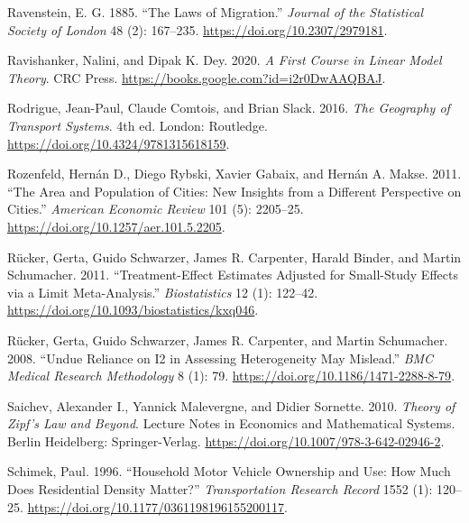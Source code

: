 \documentclass[
  11pt,
  openany]{memoir}
\newlength{\cslhangindent}
\newlength{\cslentryspacingunit} %
\newenvironment{CSLReferences}[2] %
 {%
  \setlength{\parindent}{0pt}
  \ifodd #1
  \let\oldpar\par
  \def\par{\hangindent=\cslhangindent\oldpar}
  \fi
  \setlength{\parskip}{#2\cslentryspacingunit}
 }%
 {}
\begin{document}
\begin{CSLReferences}{1}{0}
\leavevmode{}%
Ravenstein, E. G. 1885. {``The {Laws} of {Migration}.''} \emph{Journal of the Statistical Society of London} 48 (2): 167--235. \url{https://doi.org/10.2307/2979181}.

\leavevmode{}%
Ravishanker, Nalini, and Dipak K. Dey. 2020. \emph{A {First Course} in {Linear Model Theory}}. {CRC Press}. \url{https://books.google.com?id=i2r0DwAAQBAJ}.

\leavevmode{}%
Rodrigue, Jean-Paul, Claude Comtois, and Brian Slack. 2016. \emph{The {Geography} of {Transport Systems}}. 4th ed. {London}: {Routledge}. \url{https://doi.org/10.4324/9781315618159}.

\leavevmode{}%
Rozenfeld, Hernán D., Diego Rybski, Xavier Gabaix, and Hernán A. Makse. 2011. {``The {Area} and {Population} of {Cities}: New {Insights} from a {Different Perspective} on {Cities}.''} \emph{American Economic Review} 101 (5): 2205--25. \url{https://doi.org/10.1257/aer.101.5.2205}.

\leavevmode{}%
Rücker, Gerta, Guido Schwarzer, James R. Carpenter, Harald Binder, and Martin Schumacher. 2011. {``Treatment-Effect Estimates Adjusted for Small-Study Effects via a Limit Meta-Analysis.''} \emph{Biostatistics} 12 (1): 122--42. \url{https://doi.org/10.1093/biostatistics/kxq046}.

\leavevmode{}%
Rücker, Gerta, Guido Schwarzer, James R. Carpenter, and Martin Schumacher. 2008. {``Undue Reliance on {I2} in Assessing Heterogeneity May Mislead.''} \emph{BMC Medical Research Methodology} 8 (1): 79. \url{https://doi.org/10.1186/1471-2288-8-79}.

\leavevmode{}%
Saichev, Alexander I., Yannick Malevergne, and Didier Sornette. 2010. \emph{Theory of {Zipf}'s {Law} and {Beyond}}. Lecture {Notes} in {Economics} and {Mathematical Systems}. {Berlin Heidelberg}: {Springer-Verlag}. \url{https://doi.org/10.1007/978-3-642-02946-2}.

\leavevmode{}%
Schimek, Paul. 1996. {``Household {Motor Vehicle Ownership} and {Use}: How {Much Does Residential Density Matter}?''} \emph{Transportation Research Record} 1552 (1): 120--25. \url{https://doi.org/10.1177/0361198196155200117}.


\end{CSLReferences}
\end{document}
